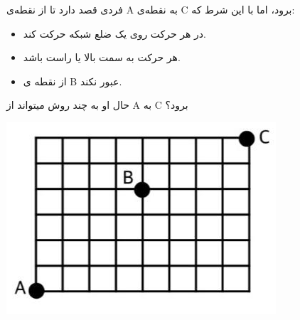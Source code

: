 \EXERCISE
فردی قصد دارد تا از نقطه‌ی A به نقطه‌ی C برود، اما با این شرط که:
\begin{itemize}
    \item 
   در هر حرکت روی یک ضلع شبکه حرکت کند.

    \item 
 هر حرکت به سمت بالا یا راست باشد.
 
	\item 
از نقطه ی B عبور نکند.
\end{itemize}

حال او به چند روش میتواند از A به C برود؟

    \begin{center}
     	\includegraphics[scale=0.2]{./6.png}
    \end{center}